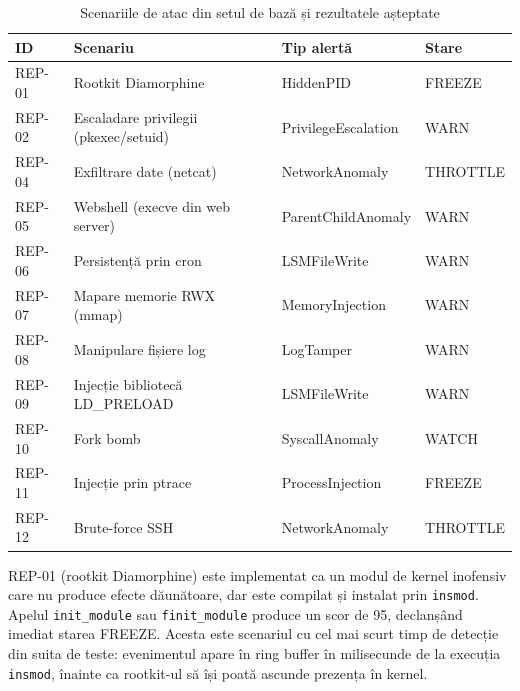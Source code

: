 \begin{table}[htbp]
\begin{center}
\begin{tabular}{|p{45pt}|p{110pt}|p{75pt}|p{55pt}|}
\hline
\textbf{ID} & \textbf{Scenariu} & \textbf{Tip alertă} & \textbf{Stare} \\
\hline\hline
REP-01 & Rootkit Diamorphine                   & HiddenPID           & FREEZE   \\
\hline
REP-02 & Escaladare privilegii (pkexec/setuid) & PrivilegeEscalation & WARN     \\
\hline
REP-04 & Exfiltrare date (netcat)              & NetworkAnomaly      & THROTTLE \\
\hline
REP-05 & Webshell (execve din web server)      & ParentChildAnomaly  & WARN     \\
\hline
REP-06 & Persistență prin cron                & LSMFileWrite        & WARN     \\
\hline
REP-07 & Mapare memorie RWX (mmap)             & MemoryInjection     & WARN     \\
\hline
REP-08 & Manipulare fișiere log               & LogTamper           & WARN     \\
\hline
REP-09 & Injecție bibliotecă LD\_PRELOAD       & LSMFileWrite        & WARN     \\
\hline
REP-10 & Fork bomb                            & SyscallAnomaly      & WATCH    \\
\hline
REP-11 & Injecție prin ptrace                 & ProcessInjection    & FREEZE   \\
\hline
REP-12 & Brute-force SSH                      & NetworkAnomaly      & THROTTLE \\
\hline
\end{tabular}
\end{center}
\caption{Scenariile de atac din setul de bază și rezultatele așteptate}
\label{tab:basic_attacks}
\end{table}

\par REP-01 (rootkit Diamorphine) este implementat ca un modul de kernel inofensiv care nu produce efecte dăunătoare, dar este compilat și instalat prin \texttt{insmod}. Apelul \texttt{init\_module} sau \texttt{finit\_module} produce un scor de 95, declanșând imediat starea FREEZE. Acesta este scenariul cu cel mai scurt timp de detecție din suita de teste: evenimentul apare în ring buffer în milisecunde de la execuția \texttt{insmod}, înainte ca rootkit-ul să își poată ascunde prezența în kernel.


